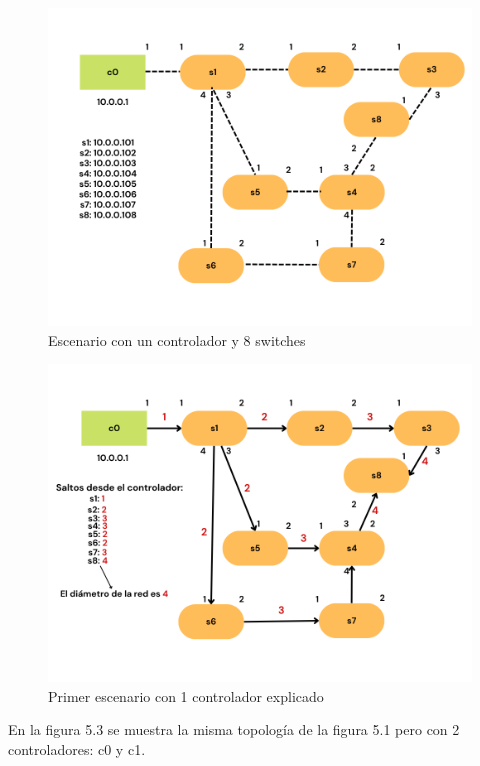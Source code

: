 \documentclass[a4paper, 12pt]{book}
\begin{document}
 	\vspace*{-18pt}
 	\begin{figure}[H]
 		\centering
 		\includegraphics[width=12cm, keepaspectratio]{img/escenario1-1}
 		\caption{Escenario con un controlador y 8 switches}
 		\label{figura:escenario1-1c}
 	\end{figure}
 	
 	\begin{figure}[H]
 		\centering
 		\includegraphics[width=12cm, keepaspectratio]{img/escenario1-explicado}
 		\caption{Primer escenario con 1 controlador explicado}
 		\label{figura:escenario1-explicado}
 		\vspace{-18pt}
 	\end{figure}
 	
 	En la figura 5.3 se muestra la misma topología de la figura 5.1 pero con 2 controladores: c0 y c1.
 	
\end{document}
